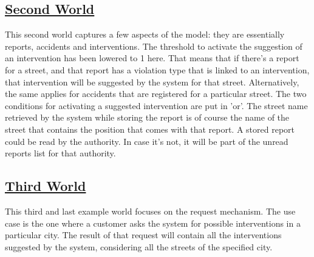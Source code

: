 	\subsection[Second World]{\hyperlink{toc}{Second World}}
	This second world captures a few aspects of the model: they are essentially reports, accidents and interventions. The threshold to activate the suggestion of an intervention has been lowered to 1 here. That means that if there's a report for a street, and that report has a violation type that is linked to an intervention, that intervention will be suggested by the system for that street. Alternatively, the same applies for accidents that are registered for a particular street. The two conditions for activating a suggested intervention are put in 'or'.
	The street name retrieved by the system while storing the report is of course the name of the street that contains the position that comes with that report.
	A stored report could be read by the authority. In case it's not, it will be part of the unread reports list for that authority.
	
	\subsection[Third World]{\hyperlink{toc}{Third World}}
	This third and last example world focuses on the request mechanism. The use case is the one where a customer asks the system for possible interventions in a particular city. The result of that request will contain all the interventions suggested by the system, considering all the streets of the specified city.
	